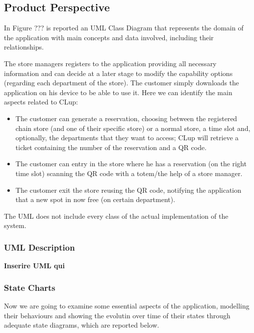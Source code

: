 \documentclass{article}
\begin{document}
	\subsection{Product Perspective}
	
	In Figure ??? is reported an UML Class Diagram that represents the domain of the application with main concepts and data involved, including their relationships.
	
	The store managers registers to the application providing all necessary information and can decide at a later stage to modify the capability options (regarding each department of the store). The customer simply downloads the application on his device to be able to use it. Here we can identify the main aspects related to CLup:
	
	\begin{itemize}
		
		\item The customer can generate a reservation, choosing between the registered chain store (and one of their specific store) or a normal store, a time slot and, optionally, the departments that they want to access; CLup will retrieve a ticket containing the number of the reservation and a QR code.
		
		\item The customer can entry in the store where he has a reservation (on the right time slot) scanning the QR code with a totem/the help of a store manager.
		
		\item The customer exit the store reusing the QR code, notifying the application that a new spot in now free (on certain department).
		
	\end{itemize}
	
	The UML does not include every class of the actual implementation of the system.
	
		\subsubsection{UML Description}

		{\bfseries Inserire UML qui}
		
		\subsubsection{State Charts}
		
		Now we are going to examine some essential aspects of the application, modelling their behaviours and showing the evolutin over time of their states through adequate state diagrams, which are reported below.
		
\end{document}
